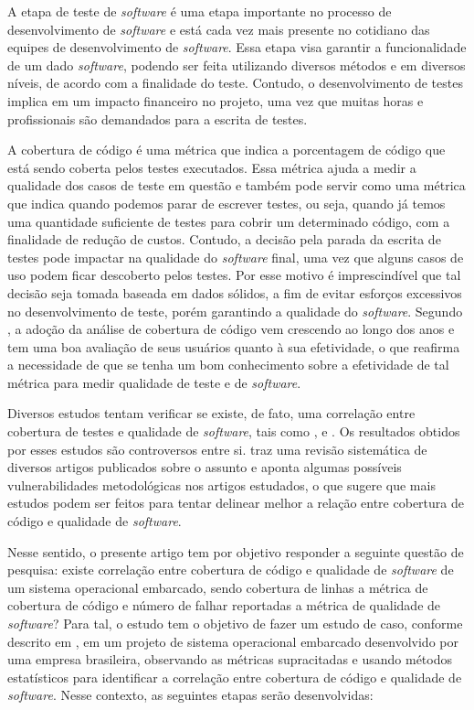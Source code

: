 \documentclass[11.5pt]{article}
\begin{document}
A etapa de teste de \textit{software} é uma etapa importante no processo de desenvolvimento de
\textit{software} e está cada vez mais presente no cotidiano das equipes de desenvolvimento de
\textit{software}.
Essa etapa visa garantir a funcionalidade de um dado \textit{software}, podendo ser feita utilizando
diversos métodos e em diversos níveis, de acordo com a finalidade do teste.
Contudo, o desenvolvimento de testes implica em um impacto financeiro no projeto, uma vez que muitas
horas e profissionais são demandados para a escrita de testes.

A cobertura de código é uma métrica que indica a porcentagem de código que está sendo coberta pelos
testes executados.
Essa métrica ajuda a medir a qualidade dos casos de teste em questão e também pode servir como uma
métrica que indica quando podemos parar de escrever testes, ou seja, quando já temos uma quantidade
suficiente de testes para cobrir um determinado código, com a finalidade de redução de custos.
Contudo, a decisão pela parada da escrita de testes pode impactar na qualidade do \textit{software}
final, uma vez que alguns casos de uso podem ficar descoberto pelos testes.
Por esse motivo é imprescindível que tal decisão seja tomada baseada em dados sólidos, a fim de
evitar esforços excessivos no desenvolvimento de teste, porém garantindo a qualidade do
\textit{software}.
Segundo \cite{coverageAtGoogle}, a adoção da análise de cobertura de código vem crescendo ao longo
dos anos e tem uma boa avaliação de seus usuários quanto à sua efetividade, o que reafirma a
necessidade de que se tenha um bom conhecimento sobre a efetividade de tal métrica para medir
qualidade de teste e de \textit{software}.

Diversos estudos tentam verificar se existe, de fato, uma correlação entre cobertura de testes e
qualidade de \textit{software}, tais como \cite{coverageMetaAnalysis}, \cite{unitTestedCrash} e
\cite{coverageLargeScaleStudy}.
Os resultados obtidos por esses estudos são controversos entre si.
\cite{coverageMetaAnalysis} traz uma revisão sistemática de diversos artigos publicados sobre o
assunto e aponta algumas possíveis vulnerabilidades metodológicas nos artigos estudados, o que
sugere que mais estudos podem ser feitos para tentar delinear melhor a relação entre cobertura de
código e qualidade de \textit{software}.

Nesse sentido, o presente artigo tem por objetivo responder a seguinte questão de pesquisa:
existe correlação entre cobertura de código e qualidade de \textit{software} de um sistema
operacional embarcado, sendo cobertura de linhas a métrica de cobertura de código e número de falhar
reportadas a métrica de qualidade de \textit{software}?
Para tal, o estudo tem o objetivo de fazer um estudo de caso, conforme descrito em
\cite{metodosPesquisa}, em um projeto de sistema operacional embarcado desenvolvido por uma empresa
brasileira, observando as métricas supracitadas e usando métodos estatísticos para identificar a
correlação entre cobertura de código e qualidade de \textit{software}.
Nesse contexto, as seguintes etapas serão desenvolvidas:
\end{document}
